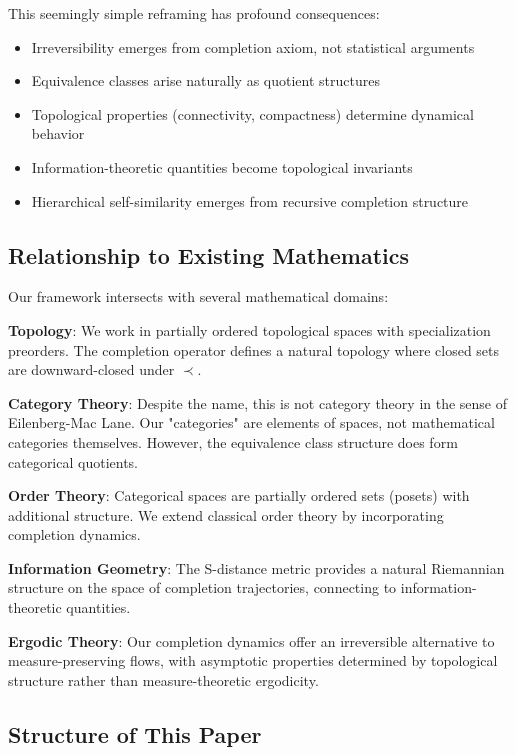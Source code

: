 \documentclass[12pt,a4paper]{article}
\begin{document}
This seemingly simple reframing has profound consequences:

\begin{itemize}
\item Irreversibility emerges from completion axiom, not statistical arguments
\item Equivalence classes arise naturally as quotient structures
\item Topological properties (connectivity, compactness) determine dynamical behavior
\item Information-theoretic quantities become topological invariants
\item Hierarchical self-similarity emerges from recursive completion structure
\end{itemize}

\subsection{Relationship to Existing Mathematics}

Our framework intersects with several mathematical domains:

\textbf{Topology}: We work in partially ordered topological spaces with specialization preorders. The completion operator defines a natural topology where closed sets are downward-closed under $\prec$.

\textbf{Category Theory}: Despite the name, this is not category theory in the sense of Eilenberg-Mac Lane. Our "categories" are elements of spaces, not mathematical categories themselves. However, the equivalence class structure does form categorical quotients.

\textbf{Order Theory}: Categorical spaces are partially ordered sets (posets) with additional structure. We extend classical order theory by incorporating completion dynamics.

\textbf{Information Geometry}: The S-distance metric provides a natural Riemannian structure on the space of completion trajectories, connecting to information-theoretic quantities.

\textbf{Ergodic Theory}: Our completion dynamics offer an irreversible alternative to measure-preserving flows, with asymptotic properties determined by topological structure rather than measure-theoretic ergodicity.

\subsection{Structure of This Paper}
\end{document}
